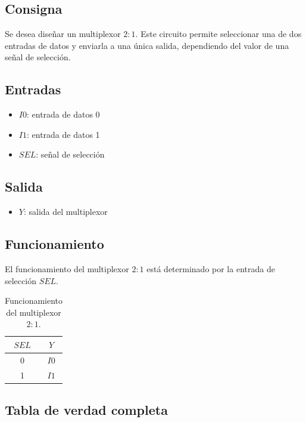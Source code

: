 \documentclass[a4paper,12pt]{article}
\begin{document}
\subsection{Consigna}

Se desea diseñar un multiplexor $2:1$. Este circuito permite seleccionar una de dos entradas de datos y enviarla a una única salida, dependiendo del valor de una señal de selección.

\subsection{Entradas}

\begin{itemize}
	\item $I0$: entrada de datos 0
	\item $I1$: entrada de datos 1
	\item $SEL$: señal de selección
\end{itemize}

\subsection{Salida}

\begin{itemize}
	\item $Y$: salida del multiplexor
\end{itemize}

\subsection{Funcionamiento}

El funcionamiento del multiplexor $2:1$ está determinado por la entrada de selección $SEL$.

\begin{table}[h]
	\centering
	\begin{tabular}{|c|c|}
		\hline
		$SEL$ & $Y$ \\ \hline
		0 & $I0$ \\ \hline
		1 & $I1$ \\ \hline
	\end{tabular}
	\caption{Funcionamiento del multiplexor $2:1$.}
	\label{tab:ej7_funcionamiento}
\end{table}

\subsection{Tabla de verdad completa}
\end{document}
